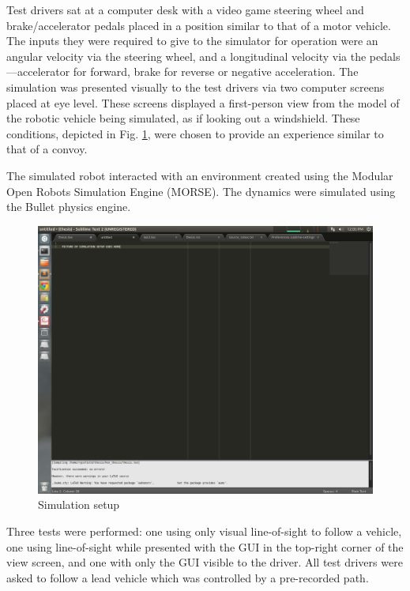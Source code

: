 \documentclass[12pt]{report}
\begin{document}
Test drivers sat at a computer desk with a video game steering wheel and brake/accelerator pedals placed in a position similar to that of a motor vehicle. The inputs they were required to give to the simulator for operation were an angular velocity via the steering wheel, and a longitudinal velocity via the pedals---accelerator for forward, brake for reverse or negative acceleration. The simulation was presented visually to the test drivers via two computer screens placed at eye level. These screens displayed a first-person view from the model of the robotic vehicle being simulated, as if looking out a windshield. These conditions, depicted in Fig. \ref{fig:simsetup}, were chosen to provide an experience similar to that of a convoy. 

The simulated robot interacted with an environment created using the Modular Open Robots Simulation Engine (MORSE). The dynamics were simulated using the Bullet physics engine.

\begin{figure}[htbp]
    \centering
    \includegraphics[width=6.5in]{./figs/sim_setup.png}
    \caption{Simulation setup}
    \label{fig:simsetup}
\end{figure}

Three tests were performed: one using only visual line-of-sight to follow a vehicle, one using line-of-sight while presented with the GUI in the top-right corner of the view screen, and one with only the GUI visible to the driver. All test drivers were asked to follow a lead vehicle which was controlled by a pre-recorded path.
\end{document}
